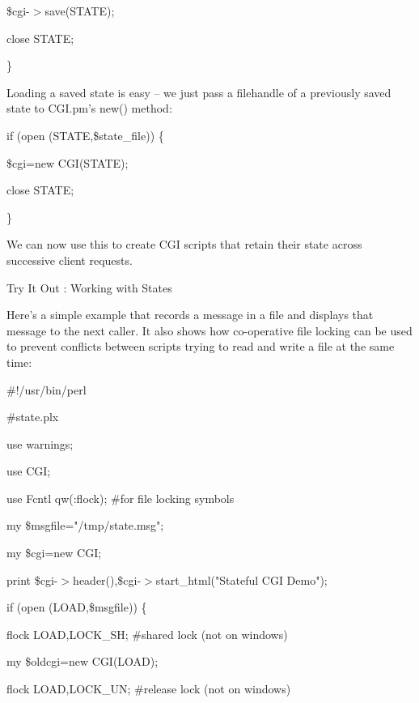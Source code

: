 \documentclass[a4paper,11pt]{book}
\begin{document}
\noindent \$cgi-$>$save(STATE);

\noindent close STATE;

\noindent \}

\noindent 

\noindent Loading a saved state is easy -- we just pass a filehandle of a previously saved state to CGI.pm's new() method:

\noindent 

\noindent if (open (STATE,\$state\_file)) \{

\noindent \$cgi=new CGI(STATE);

\noindent close STATE;

\noindent \}

\noindent 

\noindent We can now use this to create CGI scripts that retain their state across successive client requests.

\noindent 

\noindent Try It Out : Working with States

\noindent Here's a simple example that records a message in a file and displays that message to the next caller. It also shows how co-operative file locking can be used to prevent conflicts between scripts trying to read and write a file at the same time:

\noindent 

\noindent 

\noindent \#!/usr/bin/perl

\noindent \#state.plx

\noindent use warnings;

\noindent use CGI;

\noindent use Fcntl qw(:flock); \#for file locking symbols

\noindent 

\noindent my \$msgfile="/tmp/state.msg";

\noindent my \$cgi=new CGI;

\noindent 

\noindent print \$cgi-$>$header(),\$cgi-$>$start\_html("Stateful CGI Demo");

\noindent 

\noindent if (open (LOAD,\$msgfile)) \{

\noindent flock LOAD,LOCK\_SH; \#shared lock (not on windows)

\noindent my \$oldcgi=new CGI(LOAD);

\noindent flock LOAD,LOCK\_UN; \#release lock (not on windows)
\end{document}
